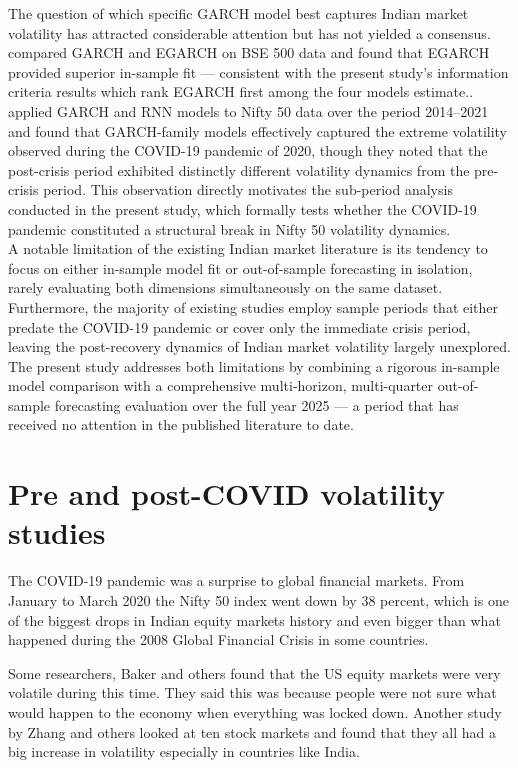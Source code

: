 The question of which specific GARCH model best captures Indian market volatility has attracted considerable attention but has not yielded a consensus. \cite{goudarzi2011} compared GARCH and EGARCH on BSE 500 data and found that EGARCH provided superior in-sample fit — consistent with the present study's information criteria results which rank EGARCH first among the four models estimate..\\
 \cite{mahajan2022} applied GARCH and RNN models to Nifty 50 data over the period 2014–2021 and found that GARCH-family models effectively captured the extreme volatility observed during the COVID-19 pandemic of 2020, though they noted that the post-crisis period exhibited distinctly different volatility dynamics from the pre-crisis period. This observation directly motivates the sub-period analysis conducted in the present study, which formally tests whether the COVID-19 pandemic constituted a structural break in Nifty 50 volatility dynamics.\\
A notable limitation of the existing Indian market literature is its tendency to focus on either in-sample model fit or out-of-sample forecasting in isolation, rarely evaluating both dimensions simultaneously on the same dataset. Furthermore, the majority of existing studies employ sample periods that either predate the COVID-19 pandemic or cover only the immediate crisis period, leaving the post-recovery dynamics of Indian market volatility largely unexplored. The present study addresses both limitations by combining a rigorous in-sample model comparison with a comprehensive multi-horizon, multi-quarter out-of-sample forecasting evaluation over the full year 2025 — a period that has received no attention in the published literature to date.


\section{Pre and post-COVID volatility studies}

The COVID-19 pandemic was a surprise to global financial markets. From January to March 2020 the Nifty 50 index went down by 38 percent, which is one of the biggest drops in Indian equity markets history and even bigger than what happened during the 2008 Global Financial Crisis in some countries.

Some researchers, Baker and others found that the US equity markets were very volatile during this time. They said this was because people were not sure what would happen to the economy when everything was locked down. Another study by Zhang and others looked at ten stock markets and found that they all had a big increase in volatility especially in countries like India.

